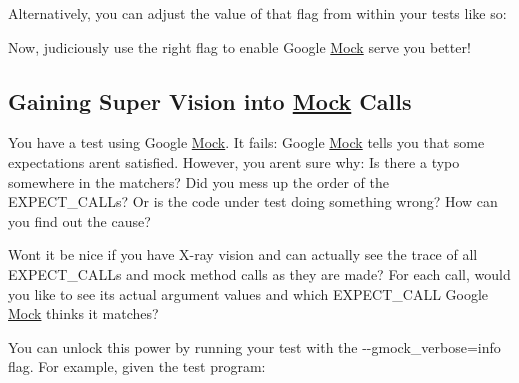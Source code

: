 Alternatively, you can adjust the value of that flag from within your tests like so\+:


\begin{DoxyCode}{0}
\end{DoxyCode}


Now, judiciously use the right flag to enable Google \mbox{\hyperlink{class_mock}{Mock}} serve you better!

\subsection*{Gaining Super Vision into \mbox{\hyperlink{class_mock}{Mock}} Calls}

You have a test using Google \mbox{\hyperlink{class_mock}{Mock}}. It fails\+: Google \mbox{\hyperlink{class_mock}{Mock}} tells you that some expectations aren\textquotesingle{}t satisfied. However, you aren\textquotesingle{}t sure why\+: Is there a typo somewhere in the matchers? Did you mess up the order of the {\ttfamily E\+X\+P\+E\+C\+T\+\_\+\+C\+A\+LL}s? Or is the code under test doing something wrong? How can you find out the cause?

Won\textquotesingle{}t it be nice if you have X-\/ray vision and can actually see the trace of all {\ttfamily E\+X\+P\+E\+C\+T\+\_\+\+C\+A\+LL}s and mock method calls as they are made? For each call, would you like to see its actual argument values and which {\ttfamily E\+X\+P\+E\+C\+T\+\_\+\+C\+A\+LL} Google \mbox{\hyperlink{class_mock}{Mock}} thinks it matches?

You can unlock this power by running your test with the {\ttfamily -\/-\/gmock\+\_\+verbose=info} flag. For example, given the test program\+:


